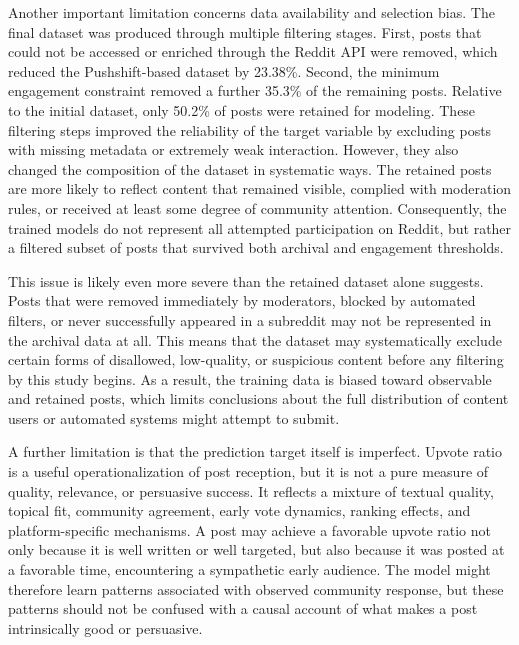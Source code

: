 Another important limitation concerns data availability and selection bias. The final dataset was produced through multiple filtering stages. First, posts that could not be accessed or enriched through the Reddit API were removed, which reduced the Pushshift-based dataset by 23.38\%. Second, the minimum engagement constraint removed a further 35.3\% of the remaining posts. Relative to the initial dataset, only 50.2\% of posts were retained for modeling. These filtering steps improved the reliability of the target variable by excluding posts with missing metadata or extremely weak interaction. However, they also changed the composition of the dataset in systematic ways. The retained posts are more likely to reflect content that remained visible, complied with moderation rules, or received at least some degree of community attention. Consequently, the trained models do not represent all attempted participation on Reddit, but rather a filtered subset of posts that survived both archival and engagement thresholds.

This issue is likely even more severe than the retained dataset alone suggests. Posts that were removed immediately by moderators, blocked by automated filters, or never successfully appeared in a subreddit may not be represented in the archival data at all. This means that the dataset may systematically exclude certain forms of disallowed, low-quality, or suspicious content before any filtering by this study begins. As a result, the training data is biased toward observable and retained posts, which limits conclusions about the full distribution of content users or automated systems might attempt to submit.

A further limitation is that the prediction target itself is imperfect. Upvote ratio is a useful operationalization of post reception, but it is not a pure measure of quality, relevance, or persuasive success. It reflects a mixture of textual quality, topical fit, community agreement, early vote dynamics, ranking effects, and platform-specific mechanisms. A post may achieve a favorable upvote ratio not only because it is well written or well targeted, but also because it was posted at a favorable time, encountering a sympathetic early audience. The model might therefore learn patterns associated with observed community response, but these patterns should not be confused with a causal account of what makes a post intrinsically good or persuasive.

